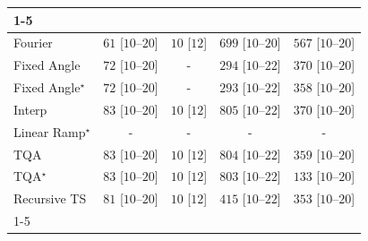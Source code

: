 \begin{tabular}{l|cccc|}
\cline{1-5}
\multicolumn{5}{c}{\rule{0pt}{8pt}SV} \\
\midrule
Fourier & {\cellcolor[HTML]{EEF8EA}} \color[HTML]{000000} $61$ [$10$--$20$] & {\cellcolor[HTML]{F7FCF5}} \color[HTML]{000000} $10$ [$12$] & {\cellcolor[HTML]{026F2E}} \color[HTML]{F1F1F1} $699$ [$10$--$20$] & {\cellcolor[HTML]{2F974E}} \color[HTML]{F1F1F1} $567$ [$10$--$20$] \\
Fixed Angle & {\cellcolor[HTML]{ECF8E8}} \color[HTML]{000000} $72$ [$10$--$20$] & {\cellcolor[HTML]{000000}} \color[HTML]{F1F1F1} {\cellcolor{white}} \color{black} - & {\cellcolor[HTML]{A7DBA0}} \color[HTML]{000000} $294$ [$10$--$22$] & {\cellcolor[HTML]{86CC85}} \color[HTML]{000000} $370$ [$10$--$20$] \\
Fixed Angle$^\star$ & {\cellcolor[HTML]{ECF8E8}} \color[HTML]{000000} $72$ [$10$--$20$] & {\cellcolor[HTML]{000000}} \color[HTML]{F1F1F1} {\cellcolor{white}} \color{black} - & {\cellcolor[HTML]{A7DBA0}} \color[HTML]{000000} $293$ [$10$--$22$] & {\cellcolor[HTML]{8ACE88}} \color[HTML]{000000} $358$ [$10$--$20$] \\
Interp & {\cellcolor[HTML]{EAF7E6}} \color[HTML]{000000} $83$ [$10$--$20$] & {\cellcolor[HTML]{F7FCF5}} \color[HTML]{000000} $10$ [$12$] & {\cellcolor[HTML]{00441B}} \color[HTML]{F1F1F1} $805$ [$10$--$22$] & {\cellcolor[HTML]{86CC85}} \color[HTML]{000000} $370$ [$10$--$20$] \\
Linear Ramp$^\star$ & {\cellcolor[HTML]{000000}} \color[HTML]{F1F1F1} {\cellcolor{white}} \color{black} - & {\cellcolor[HTML]{000000}} \color[HTML]{F1F1F1} {\cellcolor{white}} \color{black} - & {\cellcolor[HTML]{000000}} \color[HTML]{F1F1F1} {\cellcolor{white}} \color{black} - & {\cellcolor[HTML]{000000}} \color[HTML]{F1F1F1} {\cellcolor{white}} \color{black} - \\
TQA & {\cellcolor[HTML]{EAF7E6}} \color[HTML]{000000} $83$ [$10$--$20$] & {\cellcolor[HTML]{F7FCF5}} \color[HTML]{000000} $10$ [$12$] & {\cellcolor[HTML]{00441B}} \color[HTML]{F1F1F1} $804$ [$10$--$22$] & {\cellcolor[HTML]{8ACE88}} \color[HTML]{000000} $359$ [$10$--$20$] \\
TQA$^\star$ & {\cellcolor[HTML]{EAF7E6}} \color[HTML]{000000} $83$ [$10$--$20$] & {\cellcolor[HTML]{F7FCF5}} \color[HTML]{000000} $10$ [$12$] & {\cellcolor[HTML]{00441B}} \color[HTML]{F1F1F1} $803$ [$10$--$22$] & {\cellcolor[HTML]{DEF2D9}} \color[HTML]{000000} $133$ [$10$--$20$] \\
Recursive TS & {\cellcolor[HTML]{EBF7E7}} \color[HTML]{000000} $81$ [$10$--$20$] & {\cellcolor[HTML]{F7FCF5}} \color[HTML]{000000} $10$ [$12$] & {\cellcolor[HTML]{70C274}} \color[HTML]{000000} $415$ [$10$--$22$] & {\cellcolor[HTML]{8DD08A}} \color[HTML]{000000} $353$ [$10$--$20$] \\
\cline{1-5}
\bottomrule
\end{tabular}
